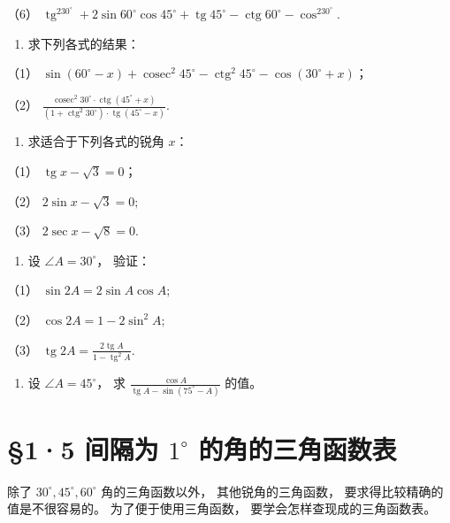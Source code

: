 （6）
\(\operatorname{tg}^230^\circ + 2 \sin 60^\circ \cos 45^\circ + \operatorname{tg} 45^\circ - \operatorname{ctg} 60^\circ - \cos^230^\circ\).

\begin{enumerate}[start=2]
\item
  求下列各式的结果：
\end{enumerate}

（1）
\(\sin (60^{\circ} - x) + \operatorname{cosec}^{2} 45^{\circ} - \operatorname{ctg}^{2} 45^{\circ} - \cos (30^{\circ} + x)\)；

（2）
\(\frac{\operatorname{cosec}^{2}30^{\circ} \cdot \operatorname{ctg}(45^{\circ} + x)}{(1 + \operatorname{ctg}^{2}30^{\circ}) \cdot \operatorname{tg}(45^{\circ} - x)}.\)

\begin{enumerate}[start=3]
\item
  求适合于下列各式的锐角 \(x\)：
\end{enumerate}

（1） \(\operatorname{tg} x - \sqrt{3} = 0\)；

（2） \(2\sin x - \sqrt{3} = 0;\)

（3） \(2\sec x - \sqrt{8} = 0.\)

\begin{enumerate}[start=4]
\item
  设 \(\angle A = 30^{\circ}\)， 验证：
\end{enumerate}

（1） \(\sin 2A = 2\sin A\cos A;\)

（2） \(\cos 2A = 1 - 2\sin^2 A;\)

（3）
\(\operatorname{tg} 2A = \frac{2\operatorname{tg} A}{1 - \operatorname{tg}^2 A}\).

\begin{enumerate}[start=5]
\item
  设 \(\angle A = 45^{\circ}\)， 求
  \(\frac{\cos A}{\operatorname{tg} A - \sin(75^{\circ} - A)}\) 的值。
\end{enumerate}

\section{\texorpdfstring{§1·5 间隔为 \(1^{\circ}\) 的角的三角函数表}{§1·5 间隔为 1\^{}\{\textbackslash circ\} 的角的三角函数表}}

除了 \(30^{\circ}, 45^{\circ}, 60^{\circ}\) 角的三角函数以外，
其他锐角的三角函数， 要求得比较精确的值是不很容易的。
为了便于使用三角函数， 要学会怎样查现成的三角函数表。


